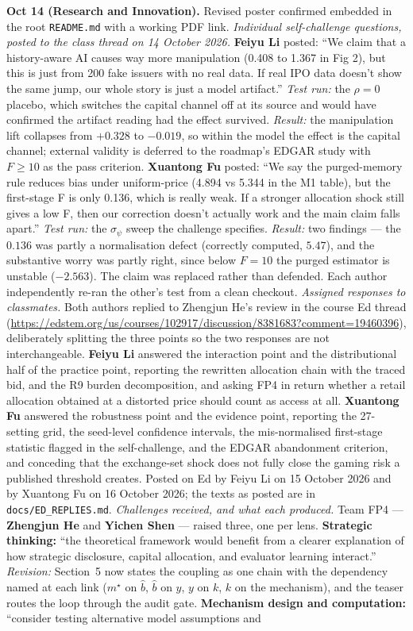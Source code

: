 \textbf{Oct 14 (Research and Innovation).} Revised poster confirmed embedded in the root \texttt{README.md} with a working PDF link. \emph{Individual self-challenge questions, posted to the class thread on 14 October 2026.} \textbf{Feiyu Li} posted: ``We claim that a history-aware AI causes way more manipulation (0.408 to 1.367 in Fig 2), but this is just from 200 fake issuers with no real data. If real IPO data doesn't show the same jump, our whole story is just a model artifact.'' \emph{Test run:} the $\rho=0$ placebo, which switches the capital channel off at its source and would have confirmed the artifact reading had the effect survived. \emph{Result:} the manipulation lift collapses from $+0.328$ to $-0.019$, so within the model the effect is the capital channel; external validity is deferred to the roadmap's EDGAR study with $F\ge10$ as the pass criterion. \textbf{Xuantong Fu} posted: ``We say the purged-memory rule reduces bias under uniform-price (4.894 vs 5.344 in the M1 table), but the first-stage F is only 0.136, which is really weak. If a stronger allocation shock still gives a low F, then our correction doesn't actually work and the main claim falls apart.'' \emph{Test run:} the $\sigma_\psi$ sweep the challenge specifies. \emph{Result:} two findings --- the $0.136$ was partly a normalisation defect (correctly computed, $5.47$), and the substantive worry was partly right, since below $F=10$ the purged estimator is unstable ($-2.563$). The claim was replaced rather than defended. Each author independently re-ran the other's test from a clean checkout. \emph{Assigned responses to classmates.} Both authors replied to Zhengjun He's review in the course Ed thread (\url{https://edstem.org/us/courses/102917/discussion/8381683?comment=19460396}), deliberately splitting the three points so the two responses are not interchangeable. \textbf{Feiyu Li} answered the interaction point and the distributional half of the practice point, reporting the rewritten allocation chain with the traced bid, and the R9 burden decomposition, and asking FP4 in return whether a retail allocation obtained at a distorted price should count as access at all. \textbf{Xuantong Fu} answered the robustness point and the evidence point, reporting the 27-setting grid, the seed-level confidence intervals, the mis-normalised first-stage statistic flagged in the self-challenge, and the EDGAR abandonment criterion, and conceding that the exchange-set shock does not fully close the gaming risk a published threshold creates. Posted on Ed by Feiyu Li on 15 October 2026 and by Xuantong Fu on 16 October 2026; the texts as posted are in \texttt{docs/ED\_REPLIES.md}. \emph{Challenges received, and what each produced.} Team FP4 --- \textbf{Zhengjun He} and \textbf{Yichen Shen} --- raised three, one per lens. \textbf{Strategic thinking:} ``the theoretical framework would benefit from a clearer explanation of how strategic disclosure, capital allocation, and evaluator learning interact.'' \emph{Revision:} Section~5 now states the coupling as one chain with the dependency named at each link ($m^\star$ on $\hat b$, $\hat b$ on $y$, $y$ on $k$, $k$ on the mechanism), and the teaser routes the loop through the audit gate. \textbf{Mechanism design and computation:} ``consider testing alternative model assumptions and 